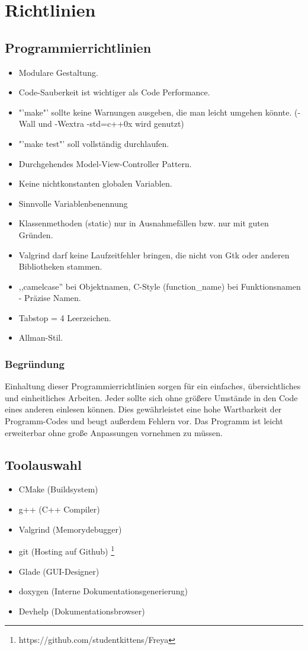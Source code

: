 \chapter{Richtlinien}
\section{Programmierrichtlinien}
\renewcommand{\labelitemi}{•}
\begin{itemize}
\item Modulare Gestaltung.
\item Code-Sauberkeit ist wichtiger als Code Performance.
\item "'make"' sollte keine Warnungen ausgeben, die man leicht umgehen könnte. (-Wall und -Wextra -std=c++0x wird genutzt)
\item "'make test"' soll vollständig durchlaufen.
\item Durchgehendes Model-View-Controller Pattern.
\item Keine nichtkonstanten globalen Variablen.
\item Sinnvolle Variablenbenennung
\item Klassenmethoden (static) nur in Ausnahmefällen bzw. nur mit guten Gründen.
\item Valgrind darf keine Laufzeitfehler bringen, die nicht von Gtk oder anderen Bibliotheken stammen.
\item ,,camelcase'' bei Objektnamen, C-Style (function\_name) bei Funktionsnamen - Präzise Namen.
\item Tabstop = 4 Leerzeichen.
\item Allman-Stil.
\end{itemize}
\subsection{Begründung}
Einhaltung dieser Programmierrichtlinien sorgen für ein einfaches, übersichtliches und einheitliches Arbeiten.
Jeder sollte sich ohne größere Umstände in den Code eines anderen einlesen können. Dies gewährleistet eine
hohe Wartbarkeit der Programm-Codes und beugt außerdem Fehlern vor. Das Programm ist leicht
erweiterbar ohne große Anpassungen vornehmen zu müssen.
\section{Toolauswahl}
\begin{itemize}
\item CMake (Buildsystem)
\item g++ (C++ Compiler)
\item Valgrind (Memorydebugger)
\item git (Hosting auf Github) \footnote{https://github.com/studentkittens/Freya}
\item Glade (GUI-Designer)
\item doxygen  (Interne Dokumentationsgenerierung)
\item Devhelp (Dokumentationsbrowser)
\end{itemize}
